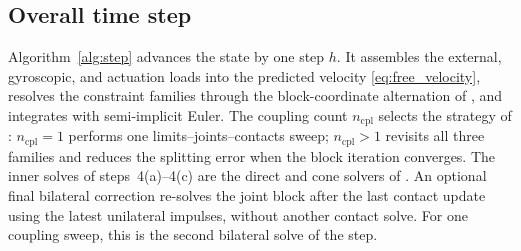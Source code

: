 \documentclass{article}
\theoremstyle{plain}
\theoremstyle{definition}
\begin{document}
\subsection{Overall time step}
\label{sec:step}
Algorithm~\ref{alg:step} advances the state by one step $h$. It assembles the
external, gyroscopic, and actuation loads into the predicted velocity
\eqref{eq:free_velocity}, resolves the constraint families through the
block-coordinate alternation of , and integrates with
semi-implicit Euler. The coupling count $n_{\mathrm{cpl}}$ selects the strategy of
: $n_{\mathrm{cpl}}{=}1$ performs one limits--joints--contacts
sweep; $n_{\mathrm{cpl}}{>}1$ revisits all three families and reduces the
splitting error when the block iteration converges. The
inner solves of steps~4(a)--4(c) are the direct and cone solvers of
.
An optional final bilateral correction re-solves the joint block after the last
contact update using the latest unilateral impulses, without another contact
solve. For one coupling sweep, this is the second bilateral solve of the step.
\end{document}
